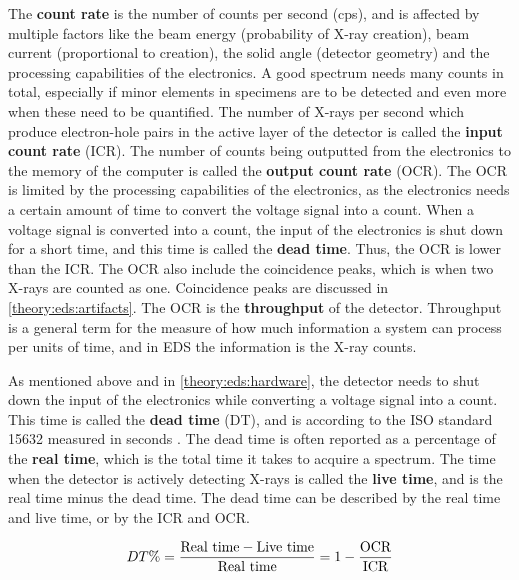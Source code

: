 The \textbf{count rate} is the number of counts per second (cps), and is affected by multiple factors like the beam energy (probability of X-ray creation), beam current (proportional to creation), the solid angle (detector geometry) and the processing capabilities of the electronics.
A good spectrum needs many counts in total, especially if minor elements in specimens are to be detected and even more when these need to be quantified.
The number of X-rays per second which produce electron-hole pairs in the active layer of the detector is called the \textbf{input count rate} (ICR).
The number of counts being outputted from the electronics to the memory of the computer is called the \textbf{output count rate} (OCR).
The OCR is limited by the processing capabilities of the electronics, as the electronics needs a certain amount of time to convert the voltage signal into a count.
When a voltage signal is converted into a count, the input of the electronics is shut down for a short time, and this time is called the \textbf{dead time}.
Thus, the OCR is lower than the ICR.
The OCR also include the coincidence peaks, which is when two X-rays are counted as one.
Coincidence peaks are discussed in \cref{theory:eds:artifacts}.
The OCR is the \textbf{throughput} of the detector.
Throughput is a general term for the measure of how much information a system can process per units of time, and in EDS the information is the X-ray counts.



As mentioned above and in \cref{theory:eds:hardware}, the detector needs to shut down the input of the electronics while converting a voltage signal into a count.
This time is called the \textbf{dead time} (DT), and is according to the ISO standard 15632 measured in seconds \cite{iso_qc_15632}.
The dead time is often reported as a percentage of the \textbf{real time}, which is the total time it takes to acquire a spectrum.
The time when the detector is actively detecting X-rays is called the \textbf{live time}, and is the real time minus the dead time.
The dead time can be described by the real time and live time, or by the ICR and OCR.

\begin{equation}
    \label{eq:dead_time}
    DT \% = \frac{\textnormal{Real time} - \textnormal{Live time}}{\textnormal{Real time}} = 1 - \frac{\textnormal{OCR}}{\textnormal{ICR}}
\end{equation}

